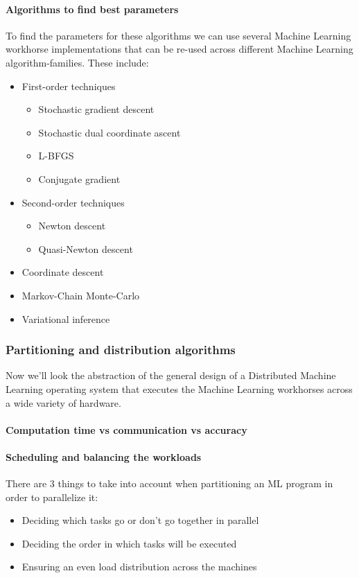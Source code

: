 \paragraph{Algorithms to find best parameters}
To find the parameters for these algorithms we can use several Machine Learning workhorse implementations that can be re-used across different Machine Learning algorithm-families. These include:
\begin{itemize}
	\item First-order techniques
	\begin{itemize}
		\item Stochastic gradient descent
		\item Stochastic dual coordinate ascent\cite{Shal13}
		\item L-BFGS
		\item Conjugate gradient
	\end{itemize}
	\item Second-order techniques
	\begin{itemize}
		\item Newton descent
		\item Quasi-Newton descent
	\end{itemize}
	\item Coordinate descent
	\item Markov-Chain Monte-Carlo
	\item Variational inference
\end{itemize}




\subsubsection{Partitioning and distribution algorithms}
Now we'll look the abstraction of the general design of a Distributed Machine Learning operating system that executes the Machine Learning workhorses across a wide variety of hardware.


\paragraph{Computation time vs communication vs accuracy}


\paragraph{Scheduling and balancing the workloads}
There are 3 things to take into account when partitioning an ML program in order to parallelize it:\cite{Xing16}\\
\begin{itemize}
	\item Deciding which tasks go or don't go together in parallel
	\item Deciding the order in which tasks will be executed
	\item Ensuring an even load distribution across the machines
\end{itemize}


